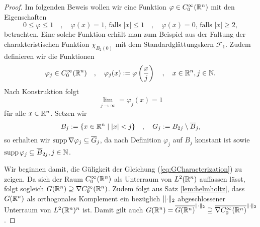 \begin{proof}
  Im folgenden Beweis wollen wir eine Funktion $\varphi \in C_0^\infty(\mathbb{R}^n)$ mit den Eigenschaften
  \begin{equation}
    \label{eq:propPhi}
  0 \leq \varphi \leq 1
  \quad,\quad
  \varphi(x) = 1 \text{, falls } |x| \leq 1
  \quad,\quad
  \varphi(x) = 0 \text{, falls } |x| \geq 2,
\end{equation}
  betrachten.
  Eine solche Funktion erhält man zum Beispiel aus der Faltung der charakteristischen Funktion $\chi_{B_2(0)}$ mit dem Standardglättungskern $\mathcal{F}_1$.
  Zudem definieren wir die Funktionen
  $$
  \varphi_j \in C_0^\infty(\mathbb{R}^n)
  \quad,\quad
  \varphi_j(x) := \varphi\left(\frac{x}{j}\right)
  \quad,\quad
  x \in \mathbb{R}^n, j \in \mathbb{N}.
  $$
  Nach Konstruktion folgt 
  \begin{equation}
    \label{eq:limPhi}
    \lim_{j \to \infty} = \varphi_j(x) = 1
  \end{equation}
  für alle $x \in \mathbb{R}^n$.
  Setzen wir
  $$
  B_j := \{ x \in \mathbb{R}^n \mid |x| < j \} 
  \quad,\quad
  G_j := B_{2j}\setminus \overline B_j,
  $$
  so erhalten wir $\operatorname{supp} \nabla \varphi_j \subseteq \overline G_j$, da nach Definition $\varphi_j$ auf $B_j$ konstant ist sowie $\operatorname{supp} \varphi_j \subseteq \overline B_{2j}, j \in \mathbb{N}$.

  Wir beginnen damit, die Güligkeit der Gleichung (\ref{eq:GCharacterization}) zu zeigen.
  Da sich der Raum $C_0^\infty(\mathbb{R}^n)$ als Unterraum von $L^2(\mathbb{R}^n)$ auffassen lässt, folgt sogleich $G(\mathbb{R}^n) \supseteq \nabla C_0^\infty(\mathbb{R}^n)$.
  Zudem folgt aus Satz \ref{lem:helmholtz}, dass $G(\mathbb{R}^n)$ als orthogonales Komplement ein bezüglich $\lVert \cdot \rVert_2$ abgeschlossener Unterraum von $L^2(\mathbb{R}^n)^n$ ist.
  Damit gilt auch $G(\mathbb{R}^n) = \overline{G(\mathbb{R}^n)}^{\lVert \cdot \rVert_2} \supseteq \overline{\nabla C_0^\infty(\mathbb{R}^n)}^{\lVert \cdot \rVert_2}$.


\end{proof}
